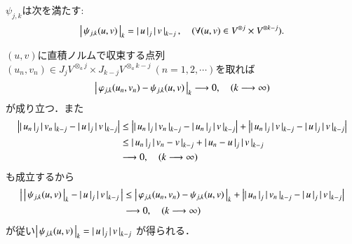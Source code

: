 	\begin{screen}
		\begin{thm}
			$\psi_{j,k}$は次を満たす:
			\begin{align}
				\left|\, \psi_{j,k}(u,v)\, \right|_{k} = \left|\, u\, \right|_{j} \left|\, v\, \right|_{k-j},
				\quad (\forall (u,v) \in V^{\otimes j} \times V^{\otimes k-j}).
			\end{align}
		\end{thm}
	\end{screen}
	
	\begin{prf}
		$(u,v)$に直積ノルムで収束する点列$(u_n,v_n) \in J_j V^{\otimes_a j} \times J_{k-j} V^{\otimes_a k-j}\ (n=1,2,\cdots)$を取れば
		\begin{align}
			\left|\, \varphi_{j,k}(u_n,v_n) - \psi_{j,k}(u,v)\, \right|_{k} \longrightarrow 0,
			\quad (k \longrightarrow \infty)
		\end{align}
		が成り立つ．また
		\begin{align}
			\left| \left|\, u_n\, \right|_{j} \left|\, v_n\, \right|_{k-j} - 
			\left|\, u\, \right|_{j} \left|\, v\, \right|_{k-j} \right|
			&\leq \left| \left|\, u_n\, \right|_{j} \left|\, v_n\, \right|_{k-j} - 
			\left|\, u_n\, \right|_{j} \left|\, v\, \right|_{k-j} \right| 
			+ \left| \left|\, u_n\, \right|_{j} \left|\, v\, \right|_{k-j} - 
			\left|\, u\, \right|_{j} \left|\, v\, \right|_{k-j} \right| \\
			&\leq \left|\, u_n\, \right|_{j} \left|\, v_n - v\, \right|_{k-j} 
			+ \left|\, u_n - u\, \right|_{j} \left|\, v\, \right|_{k-j} \\
			&\longrightarrow 0, \quad (k \longrightarrow \infty)
		\end{align}
		も成立するから
		\begin{align}
			\left|\, \left|\, \psi_{j,k}(u,v)\, \right|_{k} - \left|\, u\, \right|_{j} \left|\, v\, \right|_{k-j}\, \right|
			&\leq \left|\, \varphi_{j,k}(u_n,v_n) - \psi_{j,k}(u,v)\, \right|_{k}
				+ \left| \left|\, u_n\, \right|_{j} \left|\, v_n\, \right|_{k-j} - 
			\left|\, u\, \right|_{j} \left|\, v\, \right|_{k-j} \right| \\
			& \longrightarrow 0, \quad (k \longrightarrow \infty)
		\end{align}
		が従い$\left|\, \psi_{j,k}(u,v)\, \right|_{k} = \left|\, u\, \right|_{j} \left|\, v\, \right|_{k-j}$
		が得られる．
		\QED
	\end{prf}
	
